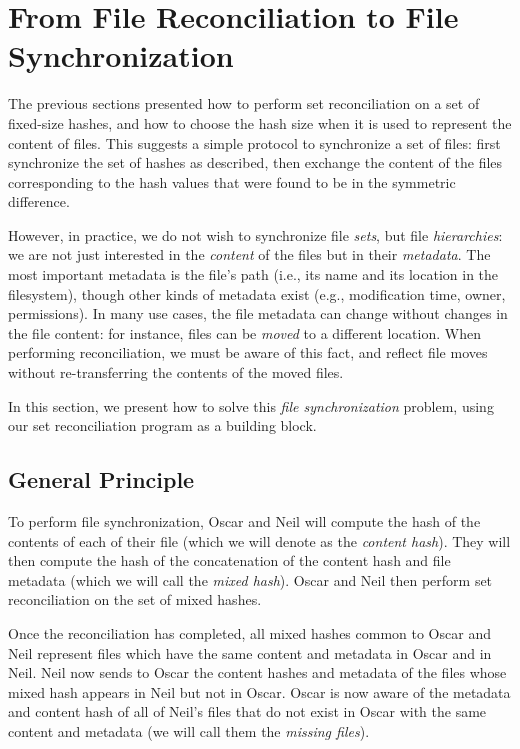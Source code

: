 \documentclass[11pt]{llncs}
\begin{document}
\section{From File Reconciliation to File Synchronization}
\label{files}

The previous sections presented how to perform set reconciliation on a set of
fixed-size hashes, and how to choose the hash size when it is used to represent
the content of files. This suggests a simple protocol to synchronize a set of
files: first synchronize the set of hashes as described, then exchange the
content of the files corresponding to the hash values that were found to be in
the symmetric difference.

However, in practice, we do not wish to synchronize file \emph{sets}, but file
\emph{hierarchies}: we are not just interested in the \emph{content} of the
files but in their \emph{metadata}. The most important metadata is the file's
path (i.e., its name and its location in the filesystem), though other kinds of
metadata exist (e.g., modification time, owner, permissions). In many use cases,
the file metadata can change without changes in the file content: for instance,
files can be \emph{moved} to a different location. When performing
reconciliation, we must be aware of this fact, and reflect file moves without
re-transferring the contents of the moved files.

In this section, we present how to solve this \emph{file synchronization}
problem, using our set reconciliation program as a building block.

\subsection{General Principle}

To perform file synchronization, Oscar and Neil will compute the hash of the
contents of each of their file (which we will denote as the \emph{content
hash}). They will then compute the hash of the concatenation of the content hash
and file metadata (which we will call the \emph{mixed hash}). Oscar and Neil
then perform set reconciliation on the set of mixed hashes.

Once the reconciliation has completed, all mixed hashes common to Oscar and Neil
represent files which have the same content and metadata in Oscar and in Neil.
Neil now sends to Oscar the content hashes and metadata of the files whose mixed
hash appears in Neil but not in Oscar. Oscar is now aware of the metadata and
content hash of all of Neil's files that do not exist in Oscar with the same
content and metadata (we will call them the \emph{missing files}).
\end{document}
